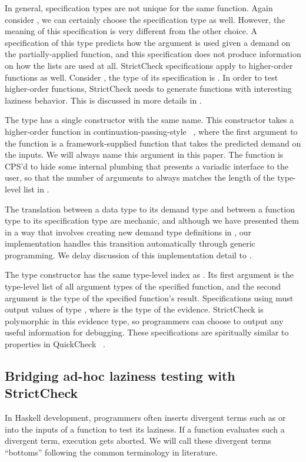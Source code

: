 \documentclass[acmsmall,review]{acmart}\settopmatter{}
\begin{document}
In general, specification types are not unique for the same
function. Again consider , we can certainly choose the
specification type  as well. However, the
meaning of this specification is very different from the other
choice. A specification of this type predicts how the 
argument is used given a demand on the partially-applied 
function, and this specification does not produce information on how
the lists are used at all. StrictCheck specifications apply to
higher-order functions as well. Consider , the type of its specification is . In order to test higher-order functions, StrictCheck needs to
generate functions with interesting laziness behavior. This is
discussed in more details in .

The  type has a single constructor with the same name. This
constructor takes a higher-order function in
continuation-passing-style ~\cite{Reynolds:1993:DC:198112.198114},
where the first argument to the function is a framework-supplied
function that takes the predicted demand on the inputs. We will always
name this argument  in this paper. The function is CPS'd
to hide some internal plumbing that presents a variadic interface to
the user, so that the number of arguments to  always
matches the length of the type-level list in .

The translation between a data type to its demand type and between a
function type to its specification type are mechanic, and although we
have presented them in a way that involves creating new demand type
definitions in , our implementation handles this
transition automatically through generic programming. We delay
discussion of this implementation detail
to .

The  type constructor has the same type-level index
as . Its first argument is the type-level list of all
argument types of the specified function, and the second argument is
the type of the specified function's result. Specifications
using  must output values of type ,
where  is the type of the evidence. StrictCheck is polymorphic
in this evidence type, so programmers can choose to output any useful
information for debugging. These specifications are spiritually
similar to properties in QuickCheck
~\cite{Claessen:2000:QLT:357766.351266}.

\subsection{Bridging ad-hoc laziness testing with StrictCheck}
In Haskell development, programmers often inserts divergent terms such
as  or  into the inputs of a function to test
its laziness. If a function evaluates such a divergent term, execution
gets aborted. We will call these divergent terms ``bottoms'' following
the common terminology in literature.
\end{document}
